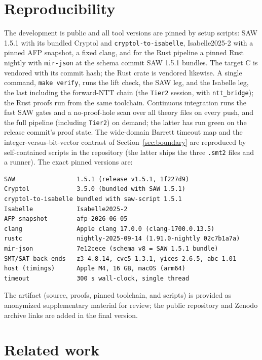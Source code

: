 \documentclass[journal=tches,submission,review]{iacrtrans}
\newcommand{\code}[1]{\texttt{#1}}
\newif\ifsubmissionanon \submissionanontrue
\begin{document}
\section{Reproducibility}\label{sec:repro}

The development is public and all tool versions are pinned by setup scripts: SAW 1.5.1 with its bundled
Cryptol and \code{cryptol-to-isabelle}, Isabelle2025-2 with a pinned AFP snapshot, a fixed clang, and for
the Rust pipeline a pinned Rust nightly with \code{mir-json} at the schema commit SAW 1.5.1 bundles. The
target C is vendored with its commit hash; the Rust crate is vendored likewise. A single command,
\code{make verify}, runs the lift check, the SAW leg, and the Isabelle leg, the last including the
forward-NTT chain (the \code{Tier2} session, with \code{ntt\_bridge}); the Rust proofs run from the same
toolchain. Continuous integration runs the fast SAW gates and a no-proof-hole scan over all theory files
on every push, and the full pipeline (including \code{Tier2}) on demand; the latter has run green on the
release commit's proof state. The wide-domain Barrett timeout map and the integer-versus-bit-vector contrast of
Section~\ref{sec:boundary} are reproduced by self-contained scripts in the repository (the latter ships
the three \code{.smt2} files and a runner). The exact pinned versions are:

\begin{lstlisting}
SAW                 1.5.1 (release v1.5.1, 1f227d9)
Cryptol             3.5.0 (bundled with SAW 1.5.1)
cryptol-to-isabelle bundled with saw-script 1.5.1
Isabelle            Isabelle2025-2
AFP snapshot        afp-2026-06-05
clang               Apple clang 17.0.0 (clang-1700.0.13.5)
rustc               nightly-2025-09-14 (1.91.0-nightly 02c7b1a7a)
mir-json            7e12cece (schema v8 = SAW 1.5.1 bundle)
SMT/SAT back-ends   z3 4.8.14, cvc5 1.3.1, yices 2.6.5, abc 1.01
host (timings)      Apple M4, 16 GB, macOS (arm64)
timeout             300 s wall-clock, single thread
\end{lstlisting}

\noindent
\ifsubmissionanon
The artifact (source, proofs, pinned toolchain, and scripts) is provided as anonymized supplementary
material for review; the public repository and Zenodo archive links are added in the final version.
\else
The artifact is archived on Zenodo, DOI
\href{https://doi.org/10.5281/zenodo.20641411}{10.5281/zenodo.20641411}, and the source is at
\url{https://github.com/amarshat/pqc-assay}.
\fi

\section{Related work}\label{sec:related}
\end{document}
